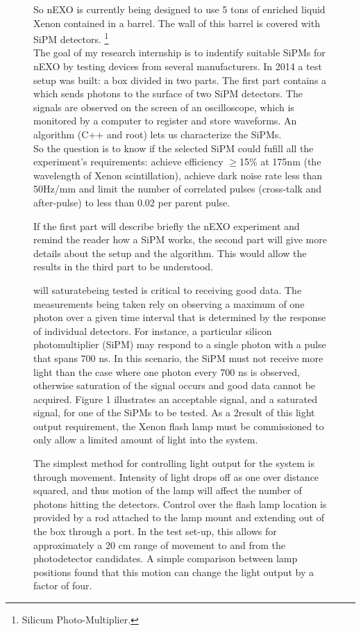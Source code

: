 \begin{figure}[!hbtp]
  So nEXO is currently being designed to use 5 tons of enriched liquid Xenon contained in a barrel. The wall of this barrel is covered with SiPM detectors. 
  \footnote{Silicum Photo-Multiplier.}
  \\  
  The goal of my research internship is to indentify suitable SiPMs for nEXO by testing devices from several manufacturers. In 2014 a test setup 
  was built: a box divided in two parts. The first part contains a \xfl which sends photons to the surface of two SiPM detectors. The signals are observed 
  on the screen of an oscilloscope, which is monitored by a computer to register and store waveforms. An algorithm (C++ and root) lets us characterize the SiPMs.
  \\
  
  So the question is to know if the selected SiPM could fufill all the experiment's requirements: achieve efficiency \(\geq\)15\% at 175nm (the wavelength 
  of Xenon scintillation), achieve dark noise rate less than 50Hz/mm\texttwosuperior{} and limit the number of correlated pulses (cross-talk and after-pulse)  
  to less than 0.02 per parent pulse.
  
  If the first part will describe briefly the nEXO experiment and remind the reader how  a SiPM works, the second part will give more details about the setup 
  and the algorithm. This would allow the results in the third part to be understood. 
  
 
  will saturatebeing tested is critical to receiving good data. The measurements
  being taken rely on observing a maximum of one photon over a given time
  interval that is determined by the response of individual detectors. For instance, a
  particular silicon photomultiplier (SiPM) may respond to a single photon with a
  pulse that spans 700 ns. In this scenario, the SiPM must not receive more light
  than the case where one photon every 700 ns is observed, otherwise saturation of
  the signal occurs and good data cannot be acquired. Figure 1 illustrates an
  acceptable signal, and a saturated signal, for one of the SiPMs to be tested. As a
  2result of this light output requirement, the Xenon flash lamp must be
  commissioned to only allow a limited amount of light into the system.

  The simplest method for controlling light output for the system is through
  movement. Intensity of light drops off as one over distance squared, and thus
  motion of the lamp will affect the number of photons hitting the detectors.
  Control over the flash lamp location is provided by a rod attached to the lamp
  mount and extending out of the box through a port. In the test set-up, this allows
  for approximately a 20 cm range of movement to and from the photodetector
  candidates. A simple comparison between lamp positions found that this motion
  can change the light output by a factor of four.


\end{figure}
